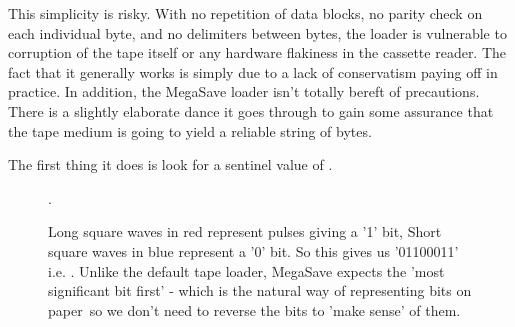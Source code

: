  
	
This simplicity is risky. With no repetition of data blocks, no parity check on each individual byte, and no delimiters between
bytes, the loader is vulnerable to corruption of the tape itself or any hardware flakiness in the cassette reader. The fact
that it generally works is simply due to a lack of conservatism paying off in practice. In addition, the MegaSave loader isn't
totally bereft of precautions. There is a slightly elaborate dance it goes through to gain some assurance that the tape
medium is going to yield a reliable string of bytes.

The first thing it does is look for a sentinel value of . 

\begin{figure}[H]
{
	\begin{adjustbox}{width=14cm,center}
	\end{adjustbox}
}\caption[]{Long square waves in red represent pulses giving a '1' bit, Short square waves in blue represent a '0' bit. So this gives
	us '01100011'\, i.e. . Unlike the default tape loader, MegaSave expects the 'most significant bit first' - which is the
natural way of representing bits on paper\, so we don't need to reverse the bits to 'make sense' of them.}.
	\end{figure}


